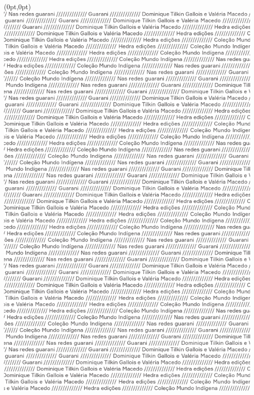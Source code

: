 \thispagestyle{empty}

\begin{textblock*}{10in}(0pt,0pt)%
\vspace*{-2.3cm}
\hspace*{-3cm}\includegraphics[width=142mm]{./ABERTURA.png}  
\end{textblock*}

\pagebreak
\blankpage



